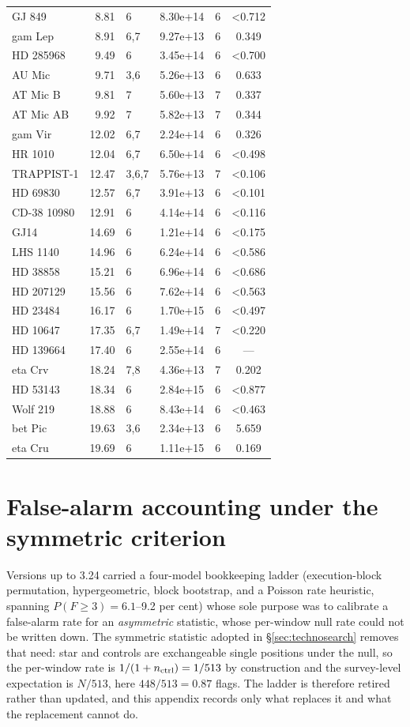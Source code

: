 \documentclass{openjournal}
\begin{document}
\begin{table}
\begin{tabular}{@{}lrlrlc@{}}
GJ 849 & 8.81 & 6 & 8.30e+14 & 6 & <0.712 \\
gam Lep & 8.91 & 6,7 & 9.27e+13 & 6 & 0.349 \\
HD 285968 & 9.49 & 6 & 3.45e+14 & 6 & <0.700 \\
AU Mic & 9.71 & 3,6 & 5.26e+13 & 6 & 0.633 \\
AT Mic B & 9.81 & 7 & 5.60e+13 & 7 & 0.337 \\
AT Mic AB & 9.92 & 7 & 5.82e+13 & 7 & 0.344 \\
gam Vir & 12.02 & 6,7 & 2.24e+14 & 6 & 0.326 \\
HR 1010 & 12.04 & 6,7 & 6.50e+14 & 6 & <0.498 \\
TRAPPIST-1 & 12.47 & 3,6,7 & 5.76e+13 & 7 & <0.106 \\
HD 69830 & 12.57 & 6,7 & 3.91e+13 & 6 & <0.101 \\
CD-38 10980 & 12.91 & 6 & 4.14e+14 & 6 & <0.116 \\
GJ14 & 14.69 & 6 & 1.21e+14 & 6 & <0.175 \\
LHS 1140 & 14.96 & 6 & 6.24e+14 & 6 & <0.586 \\
HD 38858 & 15.21 & 6 & 6.96e+14 & 6 & <0.686 \\
HD 207129 & 15.56 & 6 & 7.62e+14 & 6 & <0.563 \\
HD 23484 & 16.17 & 6 & 1.70e+15 & 6 & <0.497 \\
HD 10647 & 17.35 & 6,7 & 1.49e+14 & 7 & <0.220 \\
HD 139664 & 17.40 & 6 & 2.55e+14 & 6 & --- \\
eta Crv & 18.24 & 7,8 & 4.36e+13 & 7 & 0.202 \\
HD 53143 & 18.34 & 6 & 2.84e+15 & 6 & <0.877 \\
Wolf  219 & 18.88 & 6 & 8.43e+14 & 6 & <0.463 \\
bet Pic & 19.63 & 3,6 & 2.34e+13 & 6 & 5.659 \\
eta Cru & 19.69 & 6 & 1.11e+15 & 6 & 0.169 \\
\hline
\end{tabular}
\end{table}

\section{False-alarm accounting under the symmetric criterion}
\label{app:falsealarm}

Versions up to 3.24 carried a four-model bookkeeping ladder
(execution-block permutation, hypergeometric, block bootstrap, and a
Poisson rate heuristic, spanning $P(F{\geq}3)=6.1$--9.2 per cent) whose
sole purpose was to calibrate a false-alarm rate for an
\emph{asymmetric} statistic, whose per-window null rate could not be
written down. The symmetric statistic adopted in \S\ref{sec:technosearch}
removes that need: star and controls are exchangeable single positions
under the null, so the per-window rate is $1/(1+n_{\rm ctrl})=1/513$ by
construction and the survey-level expectation is $N/513$, here
$448/513=0.87$ flags. The ladder is therefore retired rather than
updated, and this appendix records only what replaces it and what the
replacement cannot do.
\end{document}
